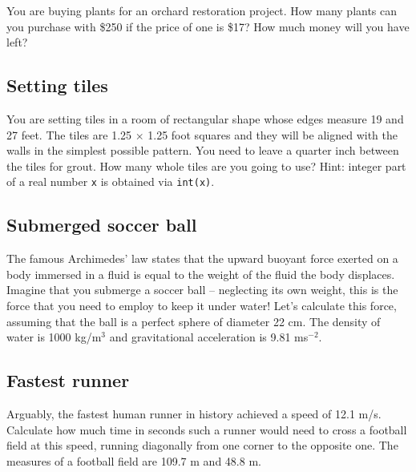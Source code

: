 You are buying plants for an orchard restoration project.
How many plants can you purchase with \$250 if the price 
of one is \$17? How much money will you have left?  


\subsection{Setting tiles}

You are setting tiles in a room of rectangular shape whose edges measure 19 and 27 feet. 
The tiles are 1.25 $\times$ 1.25 foot squares and they will be aligned with the walls
in the simplest possible pattern. You need 
to leave a quarter inch between the tiles for grout. How many whole tiles are you going to use?
Hint: integer part of a real number {\tt x} is obtained via {\tt int(x)}.


\subsection{Submerged soccer ball}

The famous Archimedes' law states that the upward buoyant force exerted on a body 
immersed in a fluid is equal to the weight of the fluid the body displaces.
Imagine that you submerge a soccer ball -- neglecting its own weight, this 
is the force that you need to employ to keep it under water! Let's calculate 
this force, assuming that the ball is a perfect sphere of diameter 22 cm.
The density of water is 1000 kg/m${^3}$ and gravitational acceleration 
is 9.81 ms${^{-2}}$. 


\subsection{Fastest runner}

Arguably, the fastest human runner in history achieved a speed of 12.1 m/s. 
Calculate how much time in seconds such a runner would need to cross a football 
field at this speed, running diagonally from one corner to the opposite one. 
The measures of a football field are 109.7 m and 48.8 m. 


